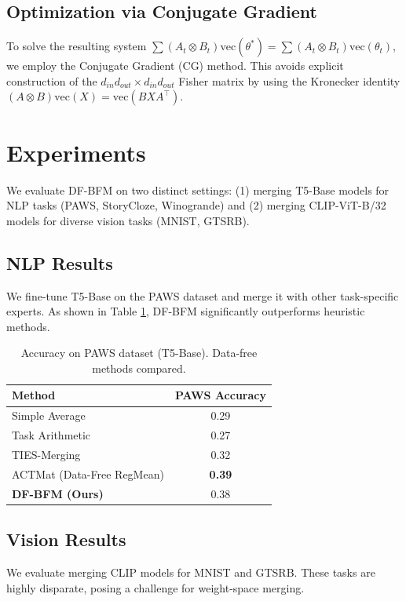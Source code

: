 \documentclass{article}
\begin{document}
\subsection{Optimization via Conjugate Gradient}
To solve the resulting system $\sum (A_t \otimes B_t) \text{vec}(\theta^*) = \sum (A_t \otimes B_t) \text{vec}(\theta_t)$, we employ the Conjugate Gradient (CG) method. This avoids explicit construction of the $d_{in}d_{out} \times d_{in}d_{out}$ Fisher matrix by using the Kronecker identity $(A \otimes B)\text{vec}(X) = \text{vec}(BXA^\top)$.

\section{Experiments}

We evaluate DF-BFM on two distinct settings: (1) merging T5-Base models for NLP tasks (PAWS, StoryCloze, Winogrande) and (2) merging CLIP-ViT-B/32 models for diverse vision tasks (MNIST, GTSRB).

\subsection{NLP Results}
We fine-tune T5-Base on the PAWS dataset and merge it with other task-specific experts. As shown in Table \ref{nlp-results-table}, DF-BFM significantly outperforms heuristic methods.

\begin{table}[h]
\caption{Accuracy on PAWS dataset (T5-Base). Data-free methods compared.}
\label{nlp-results-table}
\begin{center}
\begin{tabular}{lc}
\toprule
\bf Method & \bf PAWS Accuracy \\
\midrule
Simple Average   & 0.29 \\
Task Arithmetic  & 0.27 \\
TIES-Merging     & 0.32 \\
ACTMat (Data-Free RegMean) & \bf 0.39 \\
\bf DF-BFM (Ours) & 0.38 \\
\bottomrule
\end{tabular}
\end{center}
\end{table}

\subsection{Vision Results}
We evaluate merging CLIP models for MNIST and GTSRB. These tasks are highly disparate, posing a challenge for weight-space merging.
\end{document}
